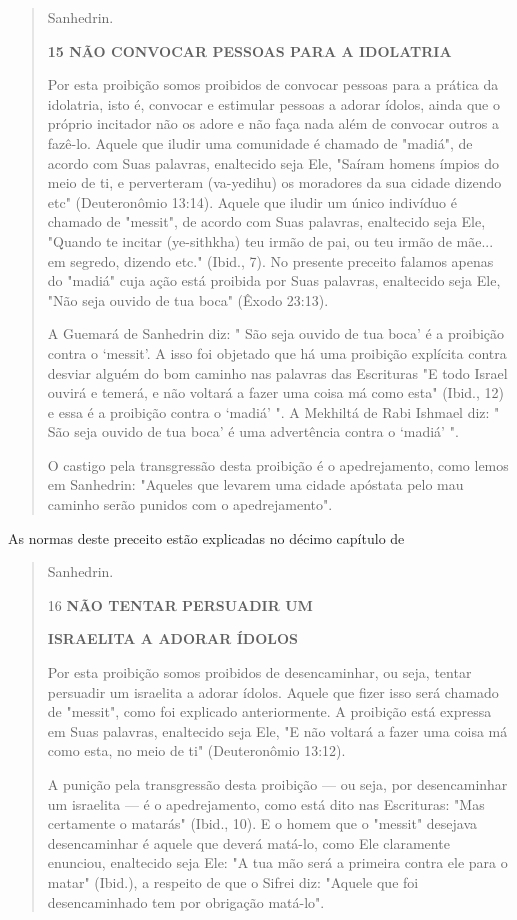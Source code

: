 \begin{quote}
Sanhedrin.

\textbf{15 NÃO CONVOCAR PESSOAS PARA A IDOLATRIA}

Por esta proibição somos proibidos de convocar pessoas para a práti­ca
da idolatria, isto é, convocar e estimular pessoas a adorar ídolos,
ainda que o próprio incitador não os adore e não faça nada além de
convocar outros a fazê-lo. Aquele que iludir uma comunidade é chamado de
"madiá", de acordo com Suas palavras, enaltecido seja Ele, "Saíram
homens ímpios do meio de ti, e per­verteram (va-yedihu) os moradores da
sua cidade dizendo etc" (Deuteronômio 13:14). Aquele que iludir um único
indivíduo é chamado de "messit", de acordo com Suas palavras, enaltecido
seja Ele, "Quando te incitar (ye-sithkha) teu irmão de pai, ou teu irmão
de mãe... em segredo, dizendo etc." (Ibid., 7). No presente preceito
falamos apenas do "madiá" cuja ação está proibida por Suas palavras,
enaltecido seja Ele, "Não seja ouvido de tua boca" (Êxodo 23:13).

A Guemará de Sanhedrin diz: " São seja ouvido de tua boca' é a proibição
contra o `messit'. A isso foi objetado que há uma proibição explícita
contra desviar alguém do bom caminho nas palavras das Escrituras "E todo
Is­rael ouvirá e temerá, e não voltará a fazer uma coisa má como esta"
(Ibid., 12) e essa é a proibição contra o `madiá' ". A Mekhiltá de Rabi
Ishmael diz: " São seja ouvido de tua boca' é uma advertência contra o
`madiá' ".

O castigo pela transgressão desta proibição é o apedrejamento, co­mo
lemos em Sanhedrin: "Aqueles que levarem uma cidade apóstata pelo mau
caminho serão punidos com o apedrejamento".
\end{quote}

As normas deste preceito estão explicadas no décimo capítulo de

\begin{quote}
Sanhedrin.

16 \textbf{NÃO TENTAR PERSUADIR UM}

\textbf{ISRAELITA A ADORAR ÍDOLOS}

Por esta proibição somos proibidos de desencaminhar, ou seja, ten­tar
persuadir um israelita a adorar ídolos. Aquele que fizer isso será
chamado de "messit", como foi explicado anteriormente. A proibição está
expressa em Suas palavras, enaltecido seja Ele, "E não voltará a fazer
uma coisa má como esta, no meio de ti" (Deuteronômio 13:12).

A punição pela transgressão desta proibição --- ou seja, por
desenca­minhar um israelita --- é o apedrejamento, como está dito nas
Escrituras: "Mas certamente o matarás" (Ibid., 10). E o homem que o
"messit" desejava desenca­minhar é aquele que deverá matá-lo, como Ele
claramente enunciou, enaltecido seja Ele: "A tua mão será a primeira
contra ele para o matar" (Ibid.), a respeito de que o Sifrei diz:
"Aquele que foi desencaminhado tem por obrigação matá-lo".
\end{quote}

